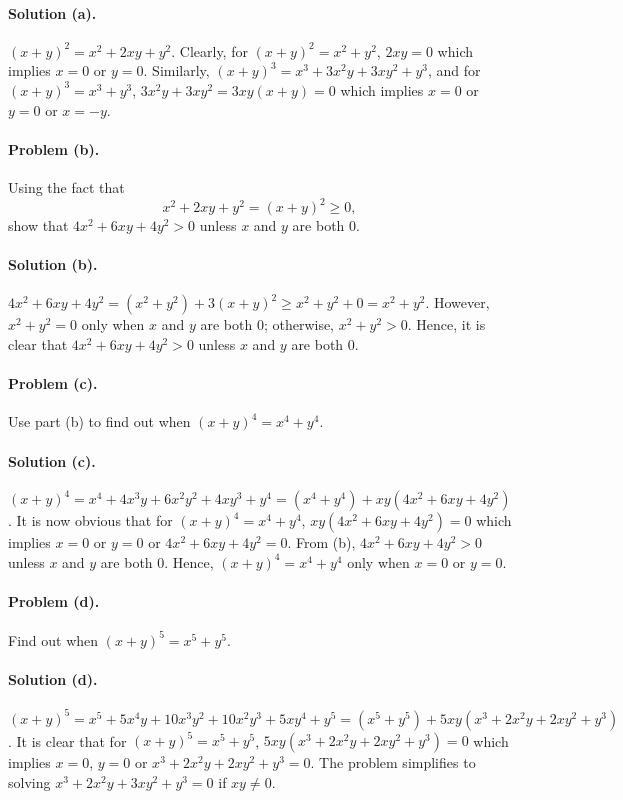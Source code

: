 \documentclass{article}
\begin{document}
\paragraph{Solution (a).} $(x + y)^2 = x^2 + 2xy + y^2$. Clearly, for $(x + y)^2 = x^2 + y^2$, $2xy = 0$ which implies $x = 0$ or $y = 0$. Similarly, $(x + y)^3 = x^3 + 3x^2y + 3xy^2 + y^3$, and for $(x + y)^3 = x^3 + y^3$, $3x^2y + 3xy^2 = 3xy(x + y) = 0$ which implies $x = 0$ or $y = 0$ or $x = -y$.

\paragraph{Problem (b).} Using the fact that \begin{equation*}
  x^2 + 2xy + y^2 = (x + y)^2 \geq 0,
\end{equation*} show that $4x^2 + 6xy + 4y^2 > 0$ unless $x$ and $y$ are both 0.

\paragraph{Solution (b).} $4x^2 + 6xy + 4y^2 = (x^2 + y^2) + 3(x + y)^2 \geq x^2 + y^2 + 0 = x^2 + y^2$. However, $x^2 + y^2 = 0$ only when $x$ and $y$ are both 0; otherwise, $x^2 + y^2 > 0$.  Hence, it is clear that $4x^2 + 6xy + 4y^2 > 0$ unless $x$ and $y$ are both 0.

\paragraph{Problem (c).} Use part (b) to find out when $(x + y)^4 = x^4 + y^4$.

\paragraph{Solution (c).} $(x + y)^4 = x^4 + 4x^3y + 6x^2y^2 + 4xy^3 + y^4 = (x^4 + y^4) + xy(4x^2 + 6xy + 4y^2)$. It is now obvious that for $(x + y)^4 = x^4 + y^4$, $xy(4x^2 + 6xy + 4y^2) = 0$ which implies $x = 0$ or $y = 0$ or $4x^2 + 6xy + 4y^2 = 0$. From (b), $4x^2 + 6xy + 4y^2 > 0$ unless $x$ and $y$ are both 0. Hence, $(x + y)^4 = x^4 + y^4$ only when $x = 0$ or $y = 0$.

\paragraph{Problem (d).} Find out when $(x + y)^5 = x^5 + y^5$.

\paragraph{Solution (d).} $(x + y)^5 = x^5 + 5x^4y + 10x^3y^2 + 10x^2y^3 + 5xy^4 + y^5 = (x^5 + y^5) + 5xy(x^3 + 2x^2y + 2xy^2 + y^3)$. It is clear that for $(x + y)^5 = x^5 + y^5$, $5xy(x^3 + 2x^2y + 2xy^2 + y^3) = 0$ which implies $x = 0$, $y = 0$ or $x^3 + 2x^2y + 2xy^2 + y^3 = 0$. The problem simplifies to solving $x^3 + 2x^2y + 3xy^2 + y^3 = 0$ if $xy \neq 0$.
\end{document}
